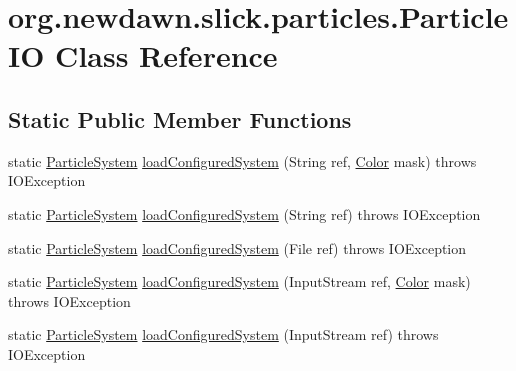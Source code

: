 \hypertarget{classorg_1_1newdawn_1_1slick_1_1particles_1_1_particle_i_o}{}\section{org.\+newdawn.\+slick.\+particles.\+Particle\+IO Class Reference}
\label{classorg_1_1newdawn_1_1slick_1_1particles_1_1_particle_i_o}
\subsection*{Static Public Member Functions}
\begin{DoxyCompactItemize}
\item 
static \mbox{\hyperlink{classorg_1_1newdawn_1_1slick_1_1particles_1_1_particle_system}{Particle\+System}} \mbox{\hyperlink{classorg_1_1newdawn_1_1slick_1_1particles_1_1_particle_i_o_a1da2bcc8784c9cf967326954bc3c9d33}{load\+Configured\+System}} (String ref, \mbox{\hyperlink{classorg_1_1newdawn_1_1slick_1_1_color}{Color}} mask)  throws I\+O\+Exception 
\item 
static \mbox{\hyperlink{classorg_1_1newdawn_1_1slick_1_1particles_1_1_particle_system}{Particle\+System}} \mbox{\hyperlink{classorg_1_1newdawn_1_1slick_1_1particles_1_1_particle_i_o_adc1ef023e9e2c247cfd88b80ff84fabc}{load\+Configured\+System}} (String ref)  throws I\+O\+Exception 
\item 
static \mbox{\hyperlink{classorg_1_1newdawn_1_1slick_1_1particles_1_1_particle_system}{Particle\+System}} \mbox{\hyperlink{classorg_1_1newdawn_1_1slick_1_1particles_1_1_particle_i_o_a02e8f7b4fbdd36e7cfbca64839bb3470}{load\+Configured\+System}} (File ref)  throws I\+O\+Exception 
\item 
static \mbox{\hyperlink{classorg_1_1newdawn_1_1slick_1_1particles_1_1_particle_system}{Particle\+System}} \mbox{\hyperlink{classorg_1_1newdawn_1_1slick_1_1particles_1_1_particle_i_o_abe9bfde54b8f6ba013afbe3b98b3ee0d}{load\+Configured\+System}} (Input\+Stream ref, \mbox{\hyperlink{classorg_1_1newdawn_1_1slick_1_1_color}{Color}} mask)  throws I\+O\+Exception 
\item 
static \mbox{\hyperlink{classorg_1_1newdawn_1_1slick_1_1particles_1_1_particle_system}{Particle\+System}} \mbox{\hyperlink{classorg_1_1newdawn_1_1slick_1_1particles_1_1_particle_i_o_a6eb42d2a3b7f681198540854d6013a46}{load\+Configured\+System}} (Input\+Stream ref)  throws I\+O\+Exception 
\item 

\end{DoxyCompactItemize}
